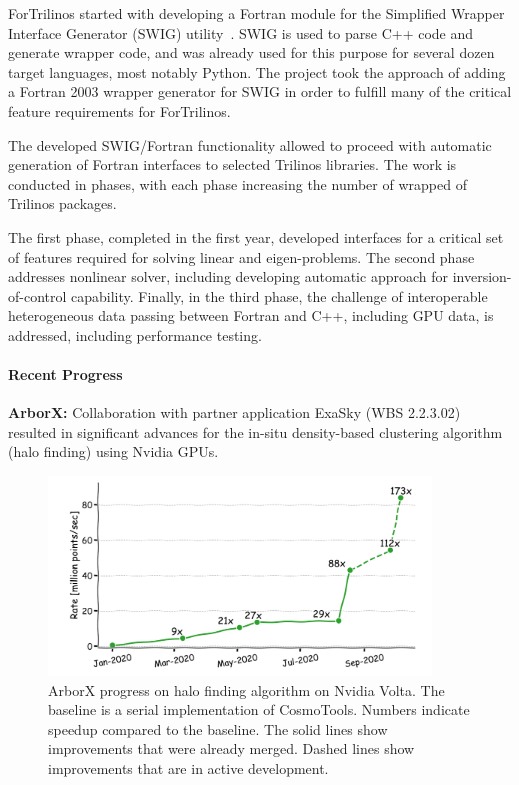 ForTrilinos started with developing a Fortran module for the Simplified Wrapper
Interface Generator (SWIG) utility~\cite{beazley1996swig}. SWIG is used to parse
C++ code and generate wrapper code, and was already used for this purpose for
several dozen target languages, most notably Python. The project took the
approach of adding a Fortran 2003 wrapper generator for SWIG in order to fulfill
many of the critical feature requirements for ForTrilinos.

The developed SWIG/Fortran functionality allowed to proceed with automatic
generation of Fortran interfaces to selected Trilinos libraries. The work is
conducted in phases, with each phase increasing the number of wrapped of
Trilinos packages.

The first phase, completed in the first year, developed interfaces for a
critical set of features required for solving linear and eigen-problems. The
second phase addresses nonlinear solver, including developing automatic approach
for inversion-of-control capability. Finally, in the third phase, the challenge
of interoperable heterogeneous data passing between Fortran and C++, including
GPU data, is addressed, including performance testing.


\paragraph{Recent Progress}

\indent

{\bf ArborX:} Collaboration with partner application ExaSky (WBS 2.2.3.02)
resulted in significant advances for the in-situ density-based clustering
algorithm (halo finding) using Nvidia GPUs.

\begin{figure}[htb]
        \centering \includegraphics[width=4.0in]{projects/2.3.3-MathLibs/2.3.3.14-ALExa-ForTrilinos/arborx_hacc_progress.png} \caption{\label{fig:arborx-hacc}
        ArborX progress on halo finding algorithm on Nvidia Volta. The baseline
        is a serial implementation of CosmoTools. Numbers indicate speedup
        compared to the baseline. The solid lines show improvements that were
        already merged. Dashed lines show improvements that are in active
        development. }
\end{figure}


